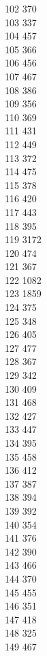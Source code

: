 { 102	370 \\
 103	337 \\
 104	457 \\
 105	366 \\
 106	456 \\
 107	467 \\
 108	386 \\
 109	356 \\
 110	369 \\
 111	431 \\
 112	449 \\
 113	372 \\
 114	475 \\
 115	378 \\
 116	420 \\
 117	443 \\
 118	395 \\
 119	3172 \\
 120	474 \\
 121	367 \\
 122	1082 \\
 123	1859 \\
 124	375 \\
 125	348 \\
 126	405 \\
 127	477 \\
 128	367 \\
 129	342 \\
 130	409 \\
 131	468 \\
 132	427 \\
 133	447 \\
 134	395 \\
 135	458 \\
 136	412 \\
 137	387 \\
 138	394 \\
 139	392 \\
 140	354 \\
 141	376 \\
 142	390 \\
 143	466 \\
 144	370 \\
 145	455 \\
 146	351 \\
 147	418 \\
 148	325 \\
 149	467 \\
}
